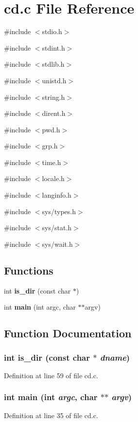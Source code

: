 \section{cd.c File Reference}
\label{cd_8c}
{\ttfamily \#include $<$stdio.h$>$}\par
{\ttfamily \#include $<$stdint.h$>$}\par
{\ttfamily \#include $<$stdlib.h$>$}\par
{\ttfamily \#include $<$unistd.h$>$}\par
{\ttfamily \#include $<$string.h$>$}\par
{\ttfamily \#include $<$dirent.h$>$}\par
{\ttfamily \#include $<$pwd.h$>$}\par
{\ttfamily \#include $<$grp.h$>$}\par
{\ttfamily \#include $<$time.h$>$}\par
{\ttfamily \#include $<$locale.h$>$}\par
{\ttfamily \#include $<$langinfo.h$>$}\par
{\ttfamily \#include $<$sys/types.h$>$}\par
{\ttfamily \#include $<$sys/stat.h$>$}\par
{\ttfamily \#include $<$sys/wait.h$>$}\par
\subsection*{Functions}
\begin{DoxyCompactItemize}
\item 
int {\bf is\_\-dir} (const char $\ast$)
\item 
int {\bf main} (int argc, char $\ast$$\ast$argv)
\end{DoxyCompactItemize}


\subsection{Function Documentation}
\subsubsection[{is\_\-dir}]{\setlength{\rightskip}{0pt plus 5cm}int is\_\-dir (const char $\ast$ {\em dname})}\label{cd_8c_a7791f3db8a56d9f73ddbd1a774023873}


Definition at line 59 of file cd.c.

\subsubsection[{main}]{\setlength{\rightskip}{0pt plus 5cm}int main (int {\em argc}, \/  char $\ast$$\ast$ {\em argv})}\label{cd_8c_a3c04138a5bfe5d72780bb7e82a18e627}


Definition at line 35 of file cd.c.

